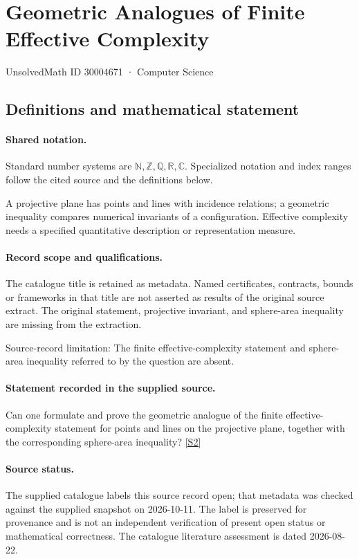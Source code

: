 \documentclass[11pt]{article}
\newcommand{\sref}[2]{\hyperlink{source:#1:#2}{[S#2]}}
\begin{document}
\setcounter{section}{30004670}
\section{Geometric Analogues of Finite Effective Complexity}\label{30004671}
{\small\sffamily UnsolvedMath ID 30004671 · Computer Science}
\subsection{Definitions and mathematical statement}

\paragraph{Shared notation.}Standard number systems are $\mathbb N,\mathbb Z,\mathbb Q,\mathbb R,\mathbb C$. Specialized notation and index ranges follow the cited source and the definitions below.


A projective plane has points and lines with incidence relations; a geometric inequality compares numerical invariants of a configuration. Effective complexity needs a specified quantitative description or representation measure.
\paragraph{Record scope and qualifications.}
The catalogue title is retained as metadata. Named certificates, contracts, bounds or frameworks in that title are not asserted as results of the original source extract.
The original statement, projective invariant, and sphere-area inequality are missing from the extraction.

Source-record limitation: The finite effective-complexity statement and sphere-area inequality referred to by the question are absent.
\paragraph{Statement recorded in the supplied source.}
Can one formulate and prove the geometric analogue of the finite effective-complexity statement for points and lines on the projective plane, together with the corresponding sphere-area inequality? \sref{30004671}{2}
\paragraph{Source status.}
The supplied catalogue labels this source record open; that metadata was checked against the supplied snapshot on 2026-10-11. The label is preserved for provenance and is not an independent verification of present open status or mathematical correctness. The catalogue literature assessment is dated 2026-08-22.
\end{document}
